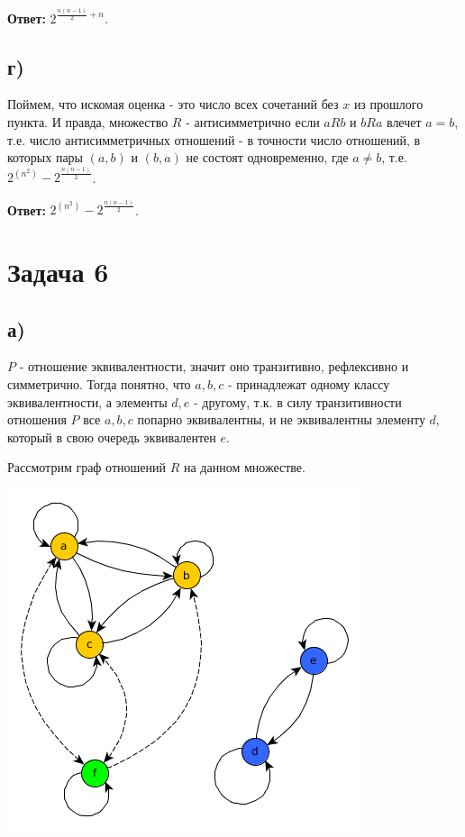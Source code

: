 \documentclass{article}
\begin{document}
	\textbf{Ответ:} $2^{\frac{n(n - 1)} {2} + n}$.
	
	  
	\subsection {г)}
	Поймем, что искомая оценка - это число всех сочетаний без $x$ из прошлого пункта. И правда, множество $R$ - антисимметрично если $a R b$ и $b R a$ влечет $a = b$, т.е. число антисимметричных отношений - в точности число отношений, в которых пары $(a, b)$ и $(b, a)$ не состоят одновременно, где $a \ne b$, т.е. $2^{(n^2)} - 2^{\frac{n(n - 1)} {2}}$.
	
	\textbf{Ответ: } $2^{(n^2)} - 2^{\frac{n(n - 1)} {2}}$.
	
	\section {Задача 6}
	\subsection {а)}
	 $P$ - отношение эквивалентности, значит оно транзитивно, рефлексивно и симметрично. Тогда понятно, что ${a, b, c}$ - принадлежат одному классу эквивалентности, а элементы ${d, e}$ - другому, т.к. в силу транзитивности отношения $P$ все $a, b, c$ попарно эквивалентны, и не эквивалентны элементу $d$, который в свою очередь эквивалентен $e$.
	
	Рассмотрим граф отношений $R$ на данном множестве.
	
\begin{center}
		\includegraphics[scale=0.5]{6_1.png}
\end{center}
	
\end{document}
